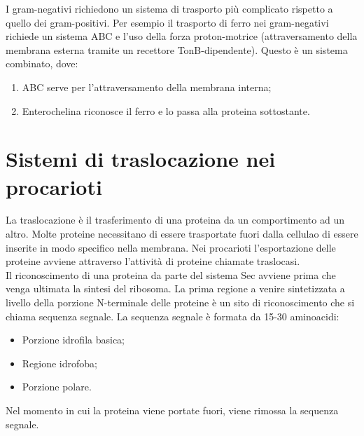 I gram-negativi richiedono un sistema di trasporto pi\`u complicato rispetto a quello dei gram-positivi. Per esempio il trasporto di ferro nei gram-negativi richiede un sistema ABC e l'uso della forza proton-motrice (attraversamento della membrana esterna tramite un recettore TonB-dipendente). Questo \`e un sistema combinato, dove:
\begin{enumerate}
    \item ABC serve per l'attraversamento della membrana interna; 
    \item Enterochelina riconosce il ferro e lo passa alla proteina sottostante.
\end{enumerate}
\section{Sistemi di traslocazione nei procarioti}
La traslocazione \`e il trasferimento di una proteina da un comportimento ad un altro. Molte proteine necessitano di essere trasportate fuori dalla cellulao di essere inserite in modo specifico nella membrana. Nei procarioti l'esportazione delle proteine avviene attraverso l'attivit\`a di proteine chiamate traslocasi. 
\\Il riconoscimento di una proteina da parte del sistema Sec avviene prima che venga ultimata la sintesi del ribosoma. La prima regione a venire sintetizzata a livello della porzione N-terminale delle proteine \`e un sito di riconoscimento che si chiama sequenza segnale. La sequenza segnale \`e formata da 15-30 aminoacidi:
\begin{itemize}
    \item Porzione idrofila basica; 
    \item Regione idrofoba; 
    \item Porzione polare.
\end{itemize}
Nel momento in cui la proteina viene portate fuori, viene rimossa la sequenza segnale.

